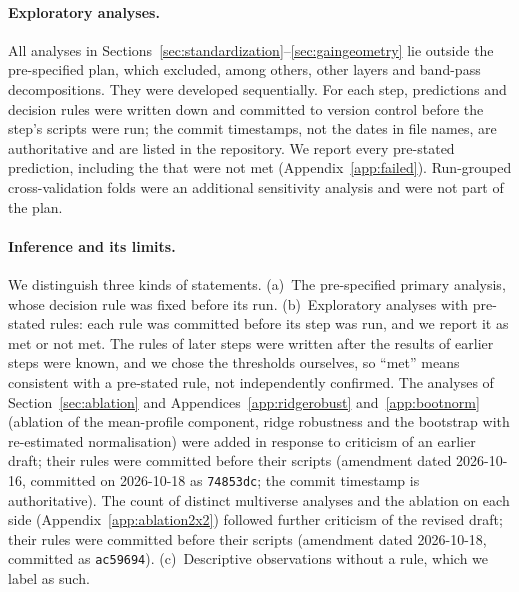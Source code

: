 \paragraph{Exploratory analyses.}
All analyses in Sections~\ref{sec:standardization}--\ref{sec:gaingeometry} lie outside
the pre-specified plan, which excluded, among others, other layers and band-pass
decompositions. They were developed sequentially. For each step, predictions and
decision rules were written down and committed to version control before the step's
scripts were run; the commit timestamps, not the dates in file names, are authoritative
and are listed in the repository. We report every pre-stated prediction, including the
\FailedPredictions{} that were not met (Appendix~\ref{app:failed}). Run-grouped cross-validation
folds were an additional sensitivity analysis and were not part of the plan.

\paragraph{Inference and its limits.}
We distinguish three kinds of statements. (a)~The pre-specified primary analysis, whose decision rule was fixed before its run. (b)~Exploratory analyses with pre-stated rules: each rule was committed before its step was run, and we report it as met or not met. The rules of later steps were written after the results of earlier steps were known, and we chose the thresholds ourselves, so ``met'' means consistent with a pre-stated rule, not independently confirmed. The analyses of Section~\ref{sec:ablation} and Appendices~\ref{app:ridgerobust} and~\ref{app:bootnorm} (ablation of the mean-profile component, ridge robustness and the bootstrap with re-estimated normalisation) were added in response to criticism of an earlier draft; their rules were committed before their scripts (amendment dated 2026-10-16, committed on 2026-10-18 as \texttt{74853dc}; the commit timestamp is authoritative). The count of distinct multiverse analyses and the ablation on each side (Appendix~\ref{app:ablation2x2}) followed further criticism of the revised draft; their rules were committed before their scripts (amendment dated 2026-10-18, committed as \texttt{ac59694}). (c)~Descriptive observations without a rule, which we label as such.

